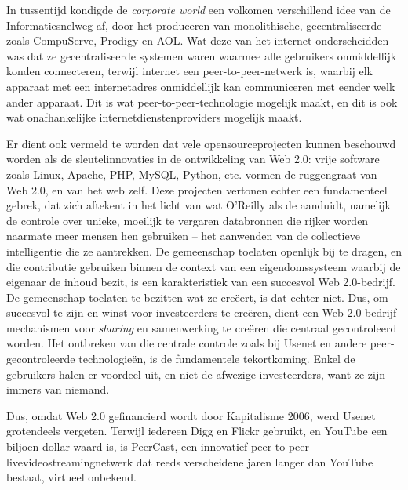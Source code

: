 {In tussentijd kondigde de {\em corporate world} een volkomen
verschillend idee van de Informatiesnelweg af, door het produceren van
monolithische, gecentraliseerde  zoals CompuServe,
Prodigy en AOL. Wat deze van het internet onderscheidden was dat ze
gecentraliseerde systemen waren waarmee alle gebruikers onmiddellijk
konden connecteren, terwijl internet een peer{}-to{}-peer{}-netwerk is,
waarbij elk apparaat met een internetadres onmiddellijk kan
communiceren met eender welk ander apparaat. Dit is wat
peer{}-to{}-peer{}-technologie mogelijk maakt, en dit is ook wat
onafhankelijke internetdienstenproviders mogelijk maakt.

Er dient ook vermeld te worden dat vele opensourceprojecten kunnen
beschouwd worden als de sleutelinnovaties in de ontwikkeling van Web
2.0: vrije software zoals Linux, Apache, PHP, MySQL, Python, etc.
vormen de ruggengraat van Web 2.0, en van het web zelf. Deze projecten
vertonen echter een fundamenteel gebrek, dat zich aftekent in het licht
van wat O'Reilly als de 
aanduidt, namelijk de controle over unieke, moeilijk te vergaren
databronnen die rijker worden naarmate meer mensen hen gebruiken {--}
het aanwenden van de collectieve intelligentie die ze aantrekken. De
gemeenschap toelaten openlijk bij te dragen, en die contributie
gebruiken binnen de context van een eigendomssysteem waarbij de
eigenaar de inhoud bezit, is een karakteristiek van een succesvol Web
2.0{}-bedrijf. De gemeenschap toelaten te bezitten wat ze cre\"eert, is
dat echter niet. Dus, om succesvol te zijn en winst voor investeerders
te cre\"eren, dient een Web 2.0{}-bedrijf mechanismen voor
{\em sharing} en samenwerking te cre\"eren die centraal
gecontroleerd worden. Het ontbreken van die centrale controle zoals bij
Usenet en andere peer{}-gecontroleerde technologie\"en, is de
fundamentele tekortkoming. Enkel de gebruikers halen er voordeel uit,
en niet de afwezige investeerders, want ze zijn immers  van
niemand. 

Dus, omdat Web 2.0 gefinancierd wordt door Kapitalisme 2006, werd Usenet
grotendeels vergeten. Terwijl iedereen Digg en Flickr gebruikt, en
YouTube een biljoen dollar waard is, is PeerCast, een innovatief
peer{}-to{}-peer{}-livevideostreamingnetwerk dat reeds verscheidene
jaren langer dan YouTube bestaat, virtueel onbekend. 

}
